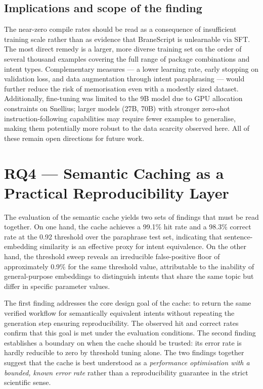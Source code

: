 \subsection{Implications and scope of the finding}

The near-zero compile rates should be read as a consequence of insufficient
training scale rather than as evidence that BraneScript is unlearnable via
SFT. The most direct remedy is a larger, more diverse training set on the
order of several thousand examples covering the full range of package
combinations and intent types. Complementary measures --- a lower learning
rate, early stopping on validation loss, and data augmentation through intent
paraphrasing --- would further reduce the risk of memorisation even with a
modestly sized dataset. Additionally, fine-tuning was limited to the 9B model
due to GPU allocation constraints on Snellius; larger models (27B, 70B) with
stronger zero-shot instruction-following capabilities may require fewer
examples to generalise, making them potentially more robust to the data
scarcity observed here. All of these remain open directions for future work.

\section{RQ4 --- Semantic Caching as a Practical Reproducibility Layer}\label{s:disc-rq4}

The evaluation of the semantic cache yields two sets of findings that must be
read together. On one hand, the cache achieves a 99.1\% hit rate and a
98.3\% correct rate at the 0.92 threshold over the paraphrase test set,
indicating that sentence-embedding similarity is an effective proxy for
intent equivalence. On the other hand, the threshold sweep reveals an irreducible
false-positive floor of approximately 0.9\% for the same threshold value, attributable to the inability
of general-purpose embeddings to distinguish intents that share the same
topic but differ in specific parameter values.

The first finding addresses the core design goal of the cache: to return the
same verified workflow for semantically equivalent intents without repeating
the generation step ensuring reproducibility. The observed hit and correct rates confirm that this
goal is met under the evaluation conditions. The second finding establishes
a boundary on when the cache should be trusted: its error rate is hardly reducible 
to zero by threshold tuning alone. The two findings together suggest that the cache
is best understood as a \emph{performance optimisation with a bounded, known error rate} rather
than a reproducibility guarantee in the strict scientific sense.

